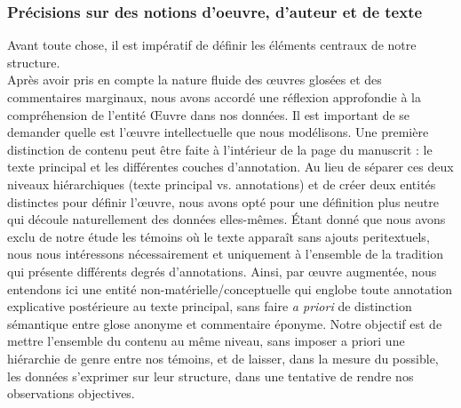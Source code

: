 \documentclass[a4paper, twoside, 12pt]{book}
\begin{document}
\subsubsection{Précisions sur des notions d'oeuvre, d'auteur et de texte}

Avant toute chose, il est impératif de définir les éléments centraux de notre structure.\\

Après avoir pris en compte la nature fluide des œuvres glosées et des commentaires marginaux, nous avons accordé une réflexion approfondie à la compréhension de l'entité \og{}Œuvre\fg{} dans nos données. Il est important de se demander quelle est l'œuvre intellectuelle que nous modélisons. Une première distinction de contenu peut être faite à l'intérieur de la page du manuscrit : le texte principal et les différentes couches d'annotation. Au lieu de séparer ces deux niveaux hiérarchiques (texte principal vs. annotations) et de créer deux entités distinctes pour définir l'œuvre, nous avons opté pour une définition plus neutre qui découle \og{}naturellement\fg{} des données elles-mêmes. Étant donné que nous avons exclu de notre étude les témoins où le texte apparaît sans ajouts peritextuels, nous nous intéressons nécessairement et uniquement à l'ensemble de la tradition qui présente différents degrés d'annotations. Ainsi, par \og{}œuvre augmentée\fg{}, nous entendons ici une entité non-matérielle/conceptuelle qui englobe toute annotation explicative postérieure au texte principal, sans faire \textit{a priori} de distinction sémantique entre \og{}glose anonyme\fg{} et \og{}commentaire éponyme\fg{}. Notre objectif est de mettre l'ensemble du contenu au même niveau, sans imposer a priori une hiérarchie de genre entre nos témoins, et de laisser, dans la mesure du possible, les données s'exprimer sur leur structure, dans une tentative de rendre nos observations objectives.\\
\end{document}
